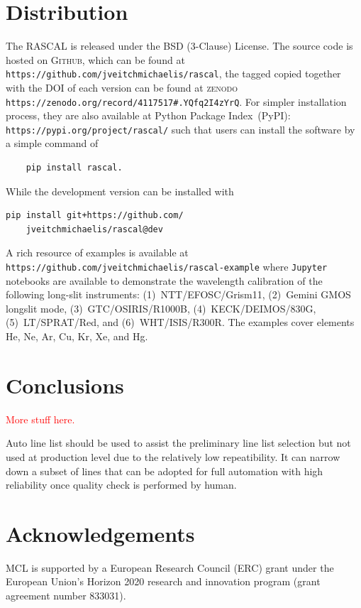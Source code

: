 \documentclass[fleqn,usenatbib]{rasti}
\begin{document}
\section{Distribution}
The \textsc{RASCAL} is released under the BSD (3-Clause) License. The
source code is hosted on \textsc{Github}, which can be found at
\verb+https://github.com/jveitchmichaelis/rascal+, the tagged copied together
with the DOI of each version can be found at
\textsc{zenodo} \verb+https://zenodo.org/record/4117517#.YQfq2I4zYrQ+.
For simpler installation process, they are also available at Python
Package Index~(PyPI): \verb+https://pypi.org/project/rascal/+ such that
users can install the software by a simple command of 
\begin{verbatim}
    pip install rascal.
\end{verbatim}
While the development version can be installed with
\begin{verbatim}
pip install git+https://github.com/
    jveitchmichaelis/rascal@dev
\end{verbatim}

A rich resource of examples is available at
\verb+https://github.com/jveitchmichaelis/rascal-example+
where \verb+Jupyter+ notebooks are available to demonstrate the wavelength
calibration of the following long-slit instruments: (1)~NTT/EFOSC/Grism11,
(2)~Gemini GMOS longslit mode, (3)~GTC/OSIRIS/R1000B, (4)~KECK/DEIMOS/830G,
(5)~LT/SPRAT/Red, and (6)~WHT/ISIS/R300R. The examples cover elements
He, Ne, Ar, Cu, Kr, Xe, and Hg.

\section{Conclusions}

\textcolor{red}{More stuff here.}

Auto line list should be used to assist the preliminary line list selection
but not used at production level due to the relatively low repeatibility.
It can narrow down a subset of lines that can be adopted for full
automation with high reliability once quality check is performed by human.


\section*{Acknowledgements}
MCL is supported by a European Research Council (ERC) grant under the European
Union’s Horizon 2020 research and innovation program (grant agreement number
833031).
\end{document}
